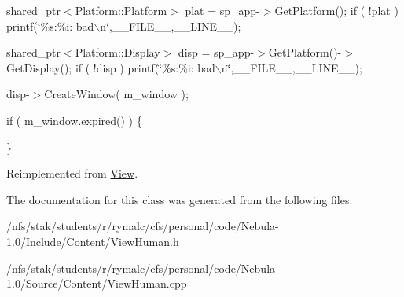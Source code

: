 shared\_\-ptr$<$Platform::Platform$>$ plat = sp\_\-app-\/$>$GetPlatform(); if ( !plat ) printf(\char`\"{}\%s:\%i: bad$\backslash$n\char`\"{},\_\-\_\-FILE\_\-\_\-,\_\-\_\-LINE\_\-\_\-);

shared\_\-ptr$<$Platform::Display$>$ disp = sp\_\-app-\/$>$GetPlatform()-\/$>$GetDisplay(); if ( !disp ) printf(\char`\"{}\%s:\%i: bad$\backslash$n\char`\"{},\_\-\_\-FILE\_\-\_\-,\_\-\_\-LINE\_\-\_\-);

disp-\/$>$CreateWindow( m\_\-window );

if ( m\_\-window.expired() ) \{

\}

Reimplemented from \hyperlink{classView}{View}.

The documentation for this class was generated from the following files:\begin{DoxyCompactItemize}
\item 
/nfs/stak/students/r/rymalc/cfs/personal/code/Nebula-\/1.0/Include/Content/ViewHuman.h\item 
/nfs/stak/students/r/rymalc/cfs/personal/code/Nebula-\/1.0/Source/Content/ViewHuman.cpp\end{DoxyCompactItemize}
